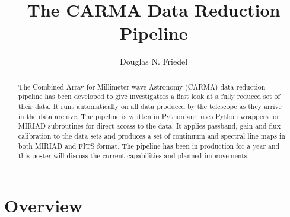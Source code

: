 
\resetcounters


\title{The CARMA Data Reduction Pipeline}
\author{Douglas N. Friedel}


\begin{abstract}
The Combined Array for Millimeter-wave Astronomy (CARMA) data reduction pipeline has been developed to give investigators a first look at a fully reduced set of their data. It runs automatically on all data produced by the telescope as they arrive in the data archive. The pipeline is written in Python and uses Python wrappers for MIRIAD subroutines for direct access to the data. It applies passband, gain and flux calibration to the data sets and produces a set of continuum and spectral line maps in both MIRIAD and FITS format. The pipeline has been in production for a year and this poster will discuss the current capabilities and planned improvements.
\end{abstract}

\section{Overview}

